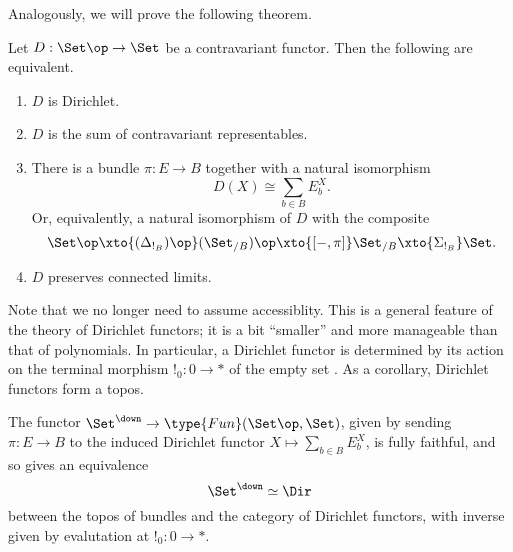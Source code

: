 Analogously, we will prove the following theorem.
\begin{thm}\label{thm:dirichlet.set.characterization}
Let $D : \Set\op \to \Set$ be a contravariant functor. Then the following are
equivalent.
\begin{enumerate}
\item $D$ is Dirichlet.
\item $D$ is the sum of contravariant representables.
\item There is a bundle $\pi : E \to B$ together with a natural isomorphism
  $$D(X) \cong \sum_{b \in B} E_b^X.$$
  Or, equivalently, a natural isomorphism of $D$ with the composite
  $$\Set\op \xto{(\Delta_{!_B})\op} (\Set_{/B})\op \xto{[-, \pi]} \Set_{/B}
  \xto{\Sigma_{!_B}} \Set.$$
\item $D$ preserves connected limits.
\end{enumerate}
\end{thm}

Note that we no longer need to assume accessiblity. This is a general feature of
the theory of Dirichlet functors; it is a bit ``smaller'' and more manageable
than that of polynomials. In particular, a Dirichlet functor is determined by
its action on the terminal morphism $!_0 : 0 \to \ast$ of the empty set . As a corollary, Dirichlet functors form a topos.

\begin{thm}\label{thm:dirichlet.set.equivalence}
The functor $\Set^{\down} \to \type{Fun}(\Set\op, \Set)$, given by sending $\pi : E
\to B$ to the induced Dirichlet functor $X \mapsto \sum_{b \in B} E_b^X$, is
fully faithful, and so gives an equivalence
$$\Set^{\down} \simeq \Dir$$
between the topos of bundles and the category of Dirichlet functors, with inverse given by evalutation at
$!_0 : 0 \to \ast$.
\end{thm}


